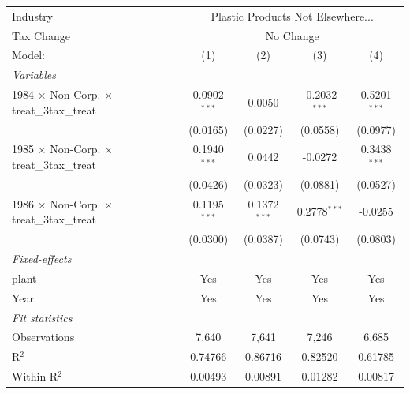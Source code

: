 \documentclass[
  12pt]{article}
\theoremstyle{definition}
\theoremstyle{remark}
\begin{document}
\begin{table}
\begin{minipage}{\linewidth}
\begin{tabular}{lcccc}
   Industry & \multicolumn{4}{c}{Plastic Products Not Elsewhere...} \\ 
   Tax Change & \multicolumn{4}{c}{No Change} \\ 
   Model:                                                  & (1)                & (2)                  & (3)                 & (4)\\  
   \midrule
   \emph{Variables}\\
   1984 $\times$ Non-Corp. $\times$ treat\_3tax\_treat     & 0.0902$^{***}$     & 0.0050               & -0.2032$^{***}$     & 0.5201$^{***}$\\   
                                                           & (0.0165)           & (0.0227)             & (0.0558)            & (0.0977)\\   
   1985 $\times$ Non-Corp. $\times$ treat\_3tax\_treat     & 0.1940$^{***}$     & 0.0442               & -0.0272             & 0.3438$^{***}$\\   
                                                           & (0.0426)           & (0.0323)             & (0.0881)            & (0.0527)\\   
   1986 $\times$ Non-Corp. $\times$ treat\_3tax\_treat     & 0.1195$^{***}$     & 0.1372$^{***}$       & 0.2778$^{***}$      & -0.0255\\   
                                                           & (0.0300)           & (0.0387)             & (0.0743)            & (0.0803)\\   
   \midrule
   \emph{Fixed-effects}\\
   plant                                                   & Yes                & Yes                  & Yes                 & Yes\\  
   Year                                                    & Yes                & Yes                  & Yes                 & Yes\\  
   \midrule
   \emph{Fit statistics}\\
   Observations                                            & 7,640              & 7,641                & 7,246               & 6,685\\  
   R$^2$                                                   & 0.74766            & 0.86716              & 0.82520             & 0.61785\\  
   Within R$^2$                                            & 0.00493            & 0.00891              & 0.01282             & 0.00817\\  
   \midrule \midrule

\end{tabular}
\end{minipage}
\end{table}
\end{document}
